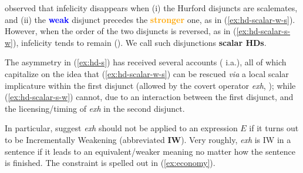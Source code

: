 	
	\citet{Gazdar1979} observed that infelicity disappears when (i) the Hurford disjuncts are scalemates, and (ii) the \textcolor{blue}{\textbf{weak}} disjunct precedes the \textcolor{orange}{\textbf{stronger}} one, as in (\ref{ex:hd-scalar-w-s}). However, when the order of the two disjuncts is reversed, as in (\ref{ex:hd-scalar-s-w}), infelicity tends to remain (\cite{Singh2008a, Singh2008b}). We call such disjunctions \textbf{scalar HDs}.
	
	
	
	\begin{exe}
		\ex\label{ex:hd-s}
		\begin{xlist}
			\label{ex:hd-scalar-w-s}
			\label{ex:hd-scalar-s-w}
		\end{xlist}
	\end{exe}

	
	
	The asymmetry in (\ref{ex:hd-s}) has received several accounts (\cite{Singh2008a,Fox2018,Tomioka2021,HenotMortier2022} i.a.), all of which capitalize on the idea that (\ref{ex:hd-scalar-w-s}) can be rescued \textit{via} a local scalar implicature within the first disjunct (allowed by the covert operator \textit{exh}, \cite{Fox2007,Spector2008}); while (\ref{ex:hd-scalar-s-w}) cannot, due to an interaction between the first disjunct, and the licensing/timing of \textit{exh} in the second disjunct.
	
	In particular, \citet{Fox2018} suggest \textit{exh} should not be applied to an expression $E$ if it turns out to be Incrementally Weakening (abbreviated \textbf{IW}). Very roughly, \textit{exh} is IW in a sentence if it leads to an equivalent/weaker meaning no matter how the sentence is finished. The constraint is spelled out in (\ref{ex:economy}).
	
